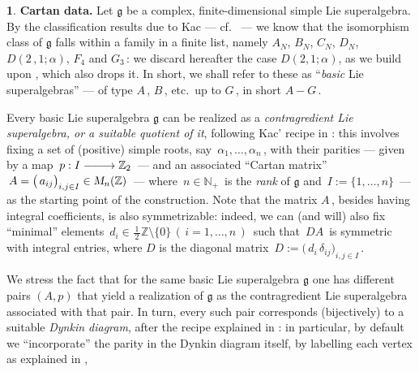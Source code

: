 \documentclass[12pt,reqno,twoside,a4paper]{amsart}
\numberwithin{equation}{section}
\theoremstyle{definition}
\newtheorem{free text}[lema]{}
\theoremstyle{remark}
\def \NN{\mathbb{N}}
\def \ZZ {\mathbb{Z}}
\def \lieg{\mathfrak{g}}
\theoremstyle{plain}
\begin{document}
\vskip9pt

\begin{free text}  \label{Cartan-data}
%
 {\bf Cartan data.}
 Let  $ \lieg $  be a complex, finite-dimensional simple Lie superalgebra.
 By the classification results due to Kac   --- cf.\ \cite{Ka2}  ---
 we know that the isomorphism class of  $ \lieg $  falls within a family in a finite list,
 namely  $ A_N $,  $ B_N $,  $ C_N $,  $ D_N $,  $ D(2\,,1;\alpha) $,  $ F_4 $  and
 $ G_3 \, $:  we discard hereafter the case  $ D(2,1;\alpha) $,  as we build upon
 \cite{Ya1},  which also drops it.  In short, we shall refer to these as
 ``\textit{basic\/}  Lie superalgebras''   --- of type  $ A \, $,  $ B \, $,  etc.\ up to
 $ G \, $,  in short  $ A-G \, $.
                                                                    \par
   Every basic Lie superalgebra  $ \lieg $  can be realized as a
   \textit{contragredient  \textsl{Lie superalgebra},  or a
   \textsl{suitable quotient}  of it},  following Kac' recipe in  \cite[\S 2.5.1]{Ka2}:
   this involves fixing a set of (positive) simple roots, say
   $ \, \alpha_1 , \dots , \alpha_n \, $,  with their parities
   --- given by a map  $ \, p : I \relbar\joinrel\relbar\joinrel\longrightarrow \ZZ_2 \, $  ---   and an associated
   ``Cartan matrix''  $ \, A = {\big(\, a_{ij} \big)}_{i, j \in I}
   \in \textsl{M}_{n}(\ZZ) \, $   --- where  $ \, n \in \NN_+ \, $
   is the  \textsl{rank\/}  of  $ \lieg $  and  $ \, I := \{1,\dots,n\} \, $  ---
   as the starting point of the construction.  Note that the matrix  $ A \, $,
   besides having integral coefficients, is also symmetrizable: indeed, we can (and will) also fix ``minimal'' elements  $ \, d_i \in \frac{\,1\,}{\,2\,} \ZZ \setminus \{0\} \, (\,i = 1, \dots, n \,) \, $  such that  $ \, DA \, $  is symmetric with integral entries, where  $ D $  is the diagonal matrix  $ \, D := {\big(\, d_i \, \delta_{ij} \big)}_{i, j \in I} \, $.
                                                                   \par
   We stress the fact that for the same basic Lie superalgebra
   $ \lieg $  one has different pairs  $ (A,p) $  that yield a realization of  $ \lieg $
   as the contragredient Lie superalgebra associated with that pair.
   In turn, every such pair corresponds (bijectively) to a suitable
   \textsl{Dynkin diagram},  after the recipe explained in  \cite[\S 2.5 (Tables IV--V)]{Ka2}:
   in particular, by default we ``incorporate'' the parity in the Dynkin diagram itself, by
   labelling each vertex as explained in  \cite{Ka2},

\end{free text}
\end{document}
